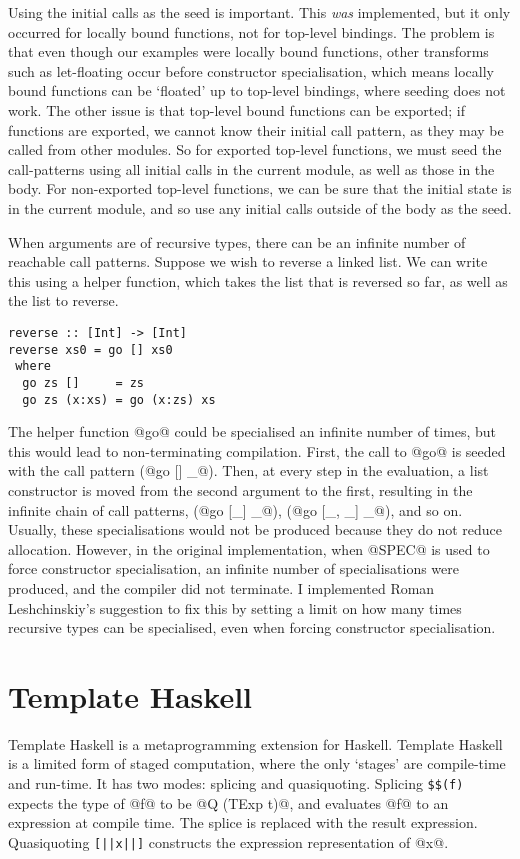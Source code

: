 Using the initial calls as the seed is important.
This \emph{was} implemented, but it only occurred for locally bound functions, not for top-level bindings.
The problem is that even though our examples were locally bound functions, other transforms such as let-floating occur before constructor specialisation, which means locally bound functions can be `floated' up to top-level bindings, where seeding does not work.
The other issue is that top-level bound functions can be exported; if functions are exported, we cannot know their initial call pattern, as they may be called from other modules.
So for exported top-level functions, we must seed the call-patterns using all initial calls in the current module, as well as those in the body.
For non-exported top-level functions, we can be sure that the initial state is in the current module, and so use any initial calls outside of the body as the seed.

When arguments are of recursive types, there can be an infinite number of reachable call patterns.
Suppose we wish to reverse a linked list.
We can write this using a helper function, which takes the list that is reversed so far, as well as the list to reverse.

\begin{lstlisting}
reverse :: [Int] -> [Int]
reverse xs0 = go [] xs0
 where
  go zs []     = zs
  go zs (x:xs) = go (x:zs) xs
\end{lstlisting}

The helper function @go@ could be specialised an infinite number of times, but this would lead to non-terminating compilation.
First, the call to @go@ is seeded with the call pattern (@go [] _@).
Then, at every step in the evaluation, a list constructor is moved from the second argument to the first, resulting in the infinite chain of call patterns, (@go [_] _@), (@go [_, _] _@), and so on.
Usually, these specialisations would not be produced because they do not reduce allocation.
However, in the original implementation, when @SPEC@ is used to force constructor specialisation, an infinite number of specialisations were produced, and the compiler did not terminate.
I implemented Roman Leshchinskiy's suggestion to fix this by setting a limit on how many times recursive types can be specialised, even when forcing constructor specialisation.


\section{Template Haskell}
Template Haskell is a metaprogramming extension for Haskell.
Template Haskell is a limited form of staged computation, where the only `stages' are compile-time and run-time.
It has two modes: splicing and quasiquoting.
Splicing \verb/$$(f)/ expects the type of @f@ to be @Q (TExp t)@, and evaluates @f@ to an expression at compile time.
The splice is replaced with the result expression.
Quasiquoting \lstinline/[||x||]/ constructs the expression representation of @x@.

